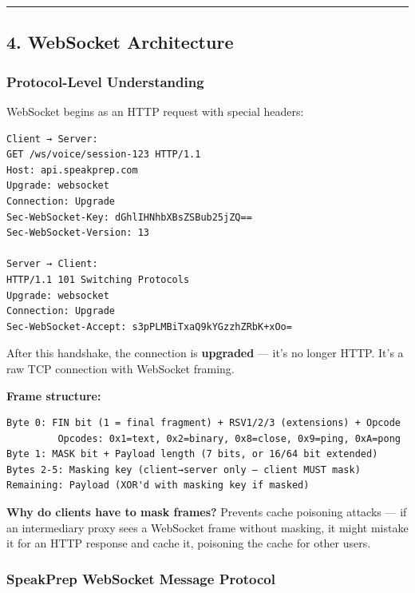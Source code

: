 \documentclass[
  11pt,
]{article}
\begin{document}
\begin{center}\rule{0.5\linewidth}{0.5pt}\end{center}

\hypertarget{websocket-architecture}{%
\subsection{4. WebSocket Architecture}\label{websocket-architecture}}

\hypertarget{protocol-level-understanding}{%
\subsubsection{Protocol-Level
Understanding}\label{protocol-level-understanding}}

WebSocket begins as an HTTP request with special headers:

\begin{lstlisting}
Client → Server:
GET /ws/voice/session-123 HTTP/1.1
Host: api.speakprep.com
Upgrade: websocket
Connection: Upgrade
Sec-WebSocket-Key: dGhlIHNhbXBsZSBub25jZQ==
Sec-WebSocket-Version: 13

Server → Client:
HTTP/1.1 101 Switching Protocols
Upgrade: websocket
Connection: Upgrade
Sec-WebSocket-Accept: s3pPLMBiTxaQ9kYGzzhZRbK+xOo=
\end{lstlisting}

After this handshake, the connection is \textbf{upgraded} --- it's no
longer HTTP. It's a raw TCP connection with WebSocket framing.

\textbf{Frame structure:}

\begin{lstlisting}
Byte 0: FIN bit (1 = final fragment) + RSV1/2/3 (extensions) + Opcode
         Opcodes: 0x1=text, 0x2=binary, 0x8=close, 0x9=ping, 0xA=pong
Byte 1: MASK bit + Payload length (7 bits, or 16/64 bit extended)
Bytes 2-5: Masking key (client→server only — client MUST mask)
Remaining: Payload (XOR'd with masking key if masked)
\end{lstlisting}

\textbf{Why do clients have to mask frames?} Prevents cache poisoning
attacks --- if an intermediary proxy sees a WebSocket frame without
masking, it might mistake it for an HTTP response and cache it,
poisoning the cache for other users.

\hypertarget{speakprep-websocket-message-protocol}{%
\subsubsection{SpeakPrep WebSocket Message
Protocol}\label{speakprep-websocket-message-protocol}}
\end{document}
